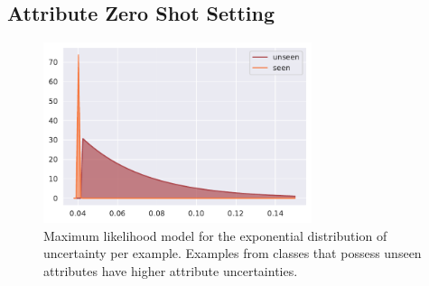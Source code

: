 \documentclass[a4paper,cleardoubleempty,BCOR1cm, 11pt]{report}
\begin{document}
\subsection{Attribute Zero Shot Setting}
\begin{figure}[t!]
	\centering
		\includegraphics[width=0.7\textwidth]{images/attr_zero_shot_class_uncertainty.pdf} 
\caption{Maximum likelihood model for the exponential distribution of uncertainty per example. Examples from classes that possess unseen attributes have higher attribute uncertainties.}
\label{fig:unseen_attr_classes}
\end{figure}
\end{document}
